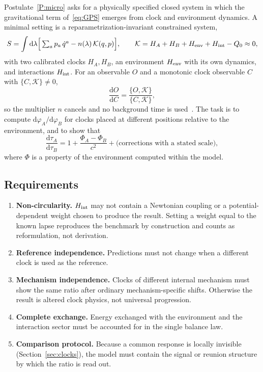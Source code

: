 \documentclass[11pt]{article}
\newcommand{\cph}{\varphi}            %
\newcommand{\dd}{\mathrm{d}}
\theoremstyle{plain}
\theoremstyle{definition}
\theoremstyle{remark}
\begin{document}
Postulate~\ref{P:micro} asks for a physically specified closed system in which the gravitational term of~\eqref{eq:GPS} emerges from clock and environment dynamics. A minimal setting is a reparametrization-invariant constrained system,
\begin{equation}
S=\int\dd\lambda\Big[\textstyle\sum_a p_a\,\dot q^a - n(\lambda)\,\mathcal K(q,p)\Big],
\qquad
\mathcal K = H_A + H_B + H_{\rm env} + H_{\rm int} - Q_0 \approx 0,
\label{eq:constraint}
\end{equation}
with two calibrated clocks $H_A,H_B$, an environment $H_{\rm env}$ with its own dynamics, and interactions $H_{\rm int}$. For an observable $O$ and a monotonic clock observable $C$ with $\{C,\mathcal K\}\neq0$,
\begin{equation}
\frac{\dd O}{\dd C}=\frac{\{O,\mathcal K\}}{\{C,\mathcal K\}},
\end{equation}
so the multiplier $n$ cancels and no background time is used~\cite{JordanDirection,PageWootters}. The task is to compute $\dd\cph_A/\dd\cph_B$ for clocks placed at different positions relative to the environment, and to show that
\begin{equation}
\frac{\dd\tau_A}{\dd\tau_B} = 1+\frac{\Phi_A-\Phi_B}{c^2}+\text{(corrections with a stated scale)},
\end{equation}
where $\Phi$ is a property of the environment computed within the model.

\subsection{Requirements}

\begin{enumerate}[R1.]
\item \textbf{Non-circularity.} $H_{\rm int}$ may not contain a Newtonian coupling or a potential-dependent weight chosen to produce the result. Setting a weight equal to the known lapse reproduces the benchmark by construction and counts as reformulation, not derivation.
\item \textbf{Reference independence.} Predictions must not change when a different clock is used as the reference.
\item \textbf{Mechanism independence.} Clocks of different internal mechanism must show the same ratio after ordinary mechanism-specific shifts. Otherwise the result is altered clock physics, not universal progression.
\item \textbf{Complete exchange.} Energy exchanged with the environment and the interaction sector must be accounted for in the single balance law.
\item \textbf{Comparison protocol.} Because a common response is locally invisible (Section~\ref{sec:clocks}), the model must contain the signal or reunion structure by which the ratio is read out.
\end{enumerate}
\end{document}
